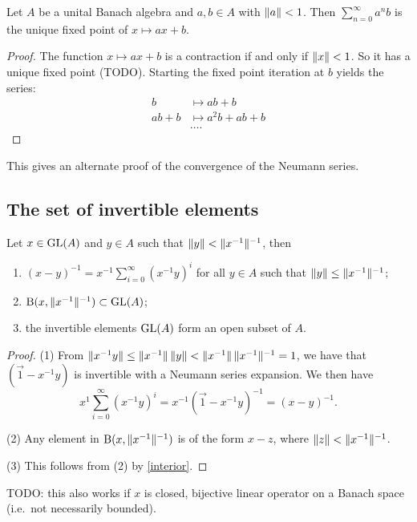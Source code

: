 \begin{lemma}
Let $A$ be a unital Banach algebra and $a,b\in A$ with $\lVert a\rVert < 1$. Then $\sum_{n=0}^\infty a^nb$ is the unique fixed point of $x\mapsto ax+b$.
\end{lemma}
\begin{proof}
The function $x\mapsto ax+b$ is a contraction if and only if $\lVert x\rVert<1$. So it has a unique fixed point (TODO). Starting the fixed point iteration at $b$ yields the series:
\begin{align*}
b &\mapsto  ab+b \\
ab+b &\mapsto a^2b + ab + b \\
&\hdots.
\end{align*}
\end{proof}
This gives an alternate proof of the convergence of the Neumann series.

\subsection{The set of invertible elements}
\begin{proposition} \label{openSetInvertibles}
Let $x\in\operatorname{GL}(A)$ and $y\in A$ such that $\lVert y\rVert < \lVert x^{-1}\rVert^{-1}$, then
\begin{enumerate}
\item $(x-y)^{-1} = x^{-1}\sum_{i=0}^\infty(x^{-1}y)^i$ for all $y\in A$ such that $\lVert y\rVert\leq \lVert x^{-1}\rVert^{-1}$;
\item $\operatorname{B}(x,\lVert x^{-1}\rVert^{-1})\subset \operatorname{GL}(A)$;
\item the invertible elements $\operatorname{GL}(A)$ form an open subset of $A$.
\end{enumerate}
\end{proposition}
\begin{proof}
(1) From $\lVert x^{-1}y\rVert \leq \lVert x^{-1}\rVert\,\lVert y\rVert < \lVert x^{-1}\rVert\,\lVert x^{-1}\rVert^{-1} = 1$, we have that $(\vec{1} - x^{-1}y)$ is invertible with a Neumann series expansion. We then have
\[ x^{1}\sum_{i=0}^\infty (x^{-1}y)^i = x^{-1}(\vec{1} - x^{-1}y)^{-1} = (x-y)^{-1}. \]

(2) Any element in  $\operatorname{B}(x,\lVert x^{-1}\rVert^{-1})$ is of the form $x-z$, where $\lVert z\rVert < \lVert x^{-1}\rVert^{-1}$.

(3) This follows from (2) by \ref{interior}.
\end{proof}
TODO: this also works if $x$ is closed, bijective linear operator on a Banach space (i.e.\ not necessarily bounded).

